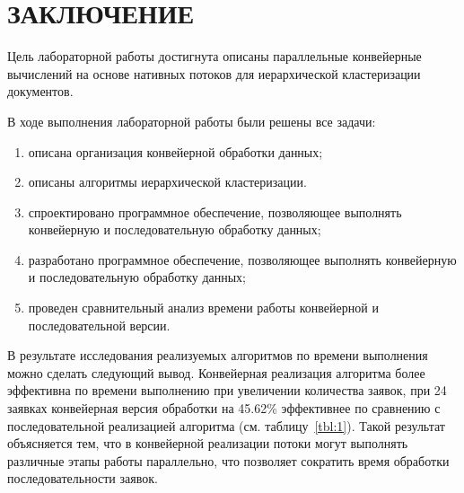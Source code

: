 \chapter*{ЗАКЛЮЧЕНИЕ}


Цель лабораторной работы достигнута описаны параллельные конвейерные  вычислений на основе нативных потоков для иерархической кластеризации документов.

В ходе выполнения лабораторной работы были решены все задачи:
\begin{enumerate}
	\item описана организация конвейерной обработки данных;
	\item описаны алгоритмы иерархической кластеризации.
	\item спроектировано программное обеспечение, позволяющее выполнять конвейерную и последовательную обработку данных;
	\item разработано программное обеспечение, позволяющее выполнять конвейерную и последовательную обработку данных;
	\item проведен сравнительный анализ времени работы конвейерной и последовательной версии.
\end{enumerate} 


В результате исследования реализуемых алгоритмов по времени выполнения можно сделать следующий вывод.
Конвейерная реализация алгоритма более эффективна по времени выполнению при увеличении количества заявок, при 24 заявках конвейерная версия обработки на 45.62\% эффективнее по сравнению с последовательной реализацией алгоритма (см. таблицу~\ref{tbl:1}).
Такой результат объясняется тем, что в конвейерной реализации потоки могут выполнять различные этапы работы параллельно, что позволяет сократить время обработки последовательности заявок.

